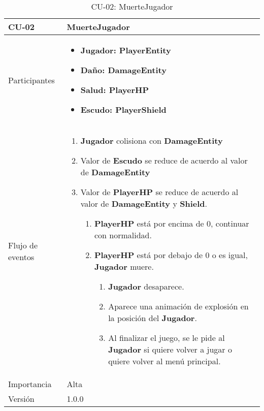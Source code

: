 \begin{table}[H]
	\centering
	\begin{tabular}{|lp{}|}
		\hline
		\rowcolor[HTML]{C0C0C0} 
		\textbf{CU-02}   & \textbf{MuerteJugador} \\ \hline
		Participantes    & \begin{itemize} 
								\item \textbf{Jugador: PlayerEntity}
								\item \textbf{Daño: DamageEntity}
								\item \textbf{Salud: PlayerHP}
								\item \textbf{Escudo: PlayerShield}
							\end{itemize}               \\ \hline
		Flujo de eventos &  \begin{enumerate}
								\item \textbf{Jugador} colisiona con \textbf{DamageEntity}
								\item Valor de \textbf{Escudo} se reduce de acuerdo al valor de \textbf{DamageEntity}
								\item Valor de \textbf{PlayerHP} se reduce de acuerdo al valor de \textbf{DamageEntity} y \textbf{Shield}.
								\begin{enumerate}
									\item \textbf{PlayerHP} está por encima de 0, continuar con normalidad.
									\item \textbf{PlayerHP} está por debajo de 0 o es igual, \textbf{Jugador} muere.
									\begin{enumerate}
										\item \textbf{Jugador} desaparece.
										\item Aparece una animación de explosión en la posición del \textbf{Jugador}.
										\item Al finalizar el juego, se le pide al \textbf{Jugador} si quiere volver a jugar o quiere volver al menú principal.
									\end{enumerate}
								\end{enumerate}
							\end{enumerate}                            \\ \hline
		Importancia      &  Alta                            \\ \hline
		Versión          &  1.0.0                            \\ \hline
	\end{tabular}
	\caption{CU-02: MuerteJugador}
\end{table}
